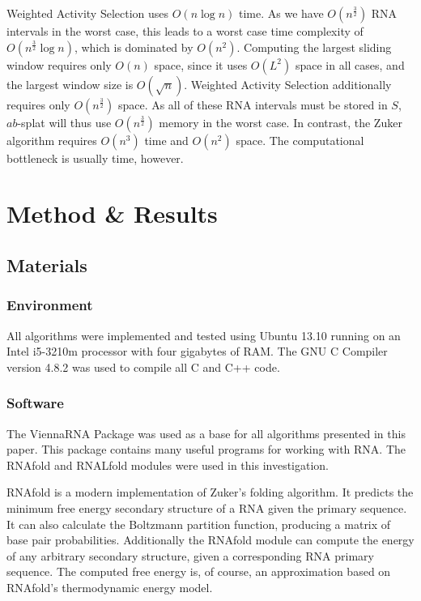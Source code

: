 \documentclass{cshonours}
\begin{document}
Weighted Activity Selection uses $O(n \log n)$ time. As we have $O(n^\frac{3}{2})$ RNA intervals in the worst case, this leads to a worst case time complexity of $O(n^\frac{3}{2} \log n)$, which is dominated by $O(n^2)$. Computing the largest sliding window requires only $O(n)$ space, since it uses $O(L^2)$ space in all cases, and the largest window size is $O(\sqrt{n})$. Weighted Activity Selection additionally requires only $O(n^\frac{3}{2})$ space. As all of these RNA intervals must be stored in $S$, $ab$-splat will thus use $O(n^\frac{3}{2})$ memory in the worst case. In contrast, the Zuker algorithm requires $O(n^3)$ time and $O(n^2)$ space. The computational bottleneck is usually time, however. 


\chapter{Method \& Results}



\section{Materials}
\subsection{Environment}
All algorithms were implemented and tested using Ubuntu 13.10 running on an Intel i5-3210m processor with four gigabytes of RAM. The GNU C Compiler version 4.8.2 was used to compile all C and C++ code. 

\subsection{Software}
The ViennaRNA Package \cite{lorenz2011viennarna} was used as a base for all algorithms presented in this paper. This package contains many useful programs for working with RNA. The RNAfold and RNALfold modules were used in this investigation. 

RNAfold is a modern implementation of Zuker's folding algorithm. It predicts the minimum free energy secondary structure of a RNA given the primary sequence. It can also calculate the Boltzmann partition function, producing a matrix of base pair probabilities. Additionally the RNAfold module can compute the energy of any arbitrary secondary structure, given a corresponding RNA primary sequence. The computed free energy is, of course, an approximation based on RNAfold's thermodynamic energy model.
\end{document}
